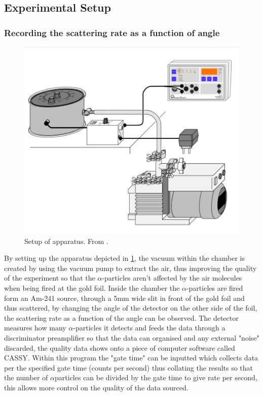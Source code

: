 \documentclass[12pt]{article}
\begin{document}
\subsection{Experimental Setup}
\label{Experimental Setup Subsection}
\subsubsection{Recording the scattering rate as a function of angle}
\label{Recording the scattering rate as a function of angle Subsubsection}

\begin{figure}[H]
\centering
\includegraphics[scale=0.5]{Images/three.png}
\caption{Setup of apparatus. From \cite{Exp.6-2019}\cite{Two}.}
\label{Setup of Apparatus}
\end{figure}

By setting up the apparatus depicted in \cref{Setup of Apparatus}, the vacuum within the chamber is created by using the vacuum pump to extract the air, thus improving the quality of the experiment so that the $\alpha$-particles aren't affected by the air molecules when being fired at the gold foil. Inside the chamber the $\alpha$-particles are fired form an Am-241 source, through a 5mm wide slit in front of the gold foil and thus scattered, by changing the angle of the detector on the other side of the foil, the scattering rate as a function of the angle can be observed. The detector measures how many $\alpha$-particles it detects and feeds the data through a discriminator preamplifier so that the data can organised and any external "noise" discarded, the quality data shows onto a piece of computer software called CASSY. Within this program the "gate time" can be inputted which collects data per the specified gate time (counts per second) thus collating the results so that the number of $\alpha$particles can be divided by the gate time to give rate per second, this allows more control on the quality of the data sourced. \\
\end{document}
